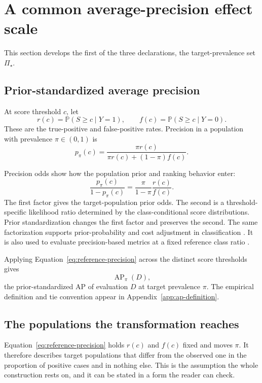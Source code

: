 \documentclass[11pt]{article}
\newcommand{\AP}{\operatorname{AP}}
\newcommand{\PSet}{\Pi_\star}
\newcommand{\Prb}{\mathbb{P}}
\theoremstyle{remark}
\begin{document}
\section{A common average-precision effect scale}
\label{sec:common-scale}

This section develops the first of the three declarations, the target-prevalence set $\PSet$.

\subsection{Prior-standardized average precision}

At score threshold $c$, let
\[
r(c)=\Prb(S\geq c\mid Y=1),
\qquad
f(c)=\Prb(S\geq c\mid Y=0).
\]
These are the true-positive and false-positive rates. Precision in a population with prevalence $\pi\in(0,1)$ is
\begin{equation}
p_\pi(c)
=
\frac{\pi r(c)}
{\pi r(c)+(1-\pi)f(c)}.
\label{eq:reference-precision}
\end{equation}

Precision odds show how the population prior and ranking behavior enter:
\begin{equation}
\frac{p_\pi(c)}{1-p_\pi(c)}
=
\frac{\pi}{1-\pi}
\frac{r(c)}{f(c)}.
\label{eq:precision-odds}
\end{equation}
The first factor gives the target-population prior odds. The second is a threshold-specific likelihood ratio determined by the class-conditional score distributions. Prior standardization changes the first factor and preserves the second. The same factorization supports prior-probability and cost adjustment in classification \cite{elkan2001foundations}. It is also used to evaluate precision-based metrics at a fixed reference class ratio \cite{siblini2020calibration,degeest2016online}.

Applying Equation~\eqref{eq:reference-precision} across the distinct score thresholds gives
\[
\AP_\pi(D),
\]
the prior-standardized AP of evaluation $D$ at target prevalence $\pi$. The empirical definition and tie convention appear in Appendix~\ref{app:ap-definition}.

\subsection{The populations the transformation reaches}
\label{sec:transport}

Equation~\eqref{eq:reference-precision} holds $r(c)$ and $f(c)$ fixed and moves $\pi$. It therefore describes target populations that differ from the observed one in the proportion of positive cases and in nothing else. This is the assumption the whole construction rests on, and it can be stated in a form the reader can check.
\end{document}
